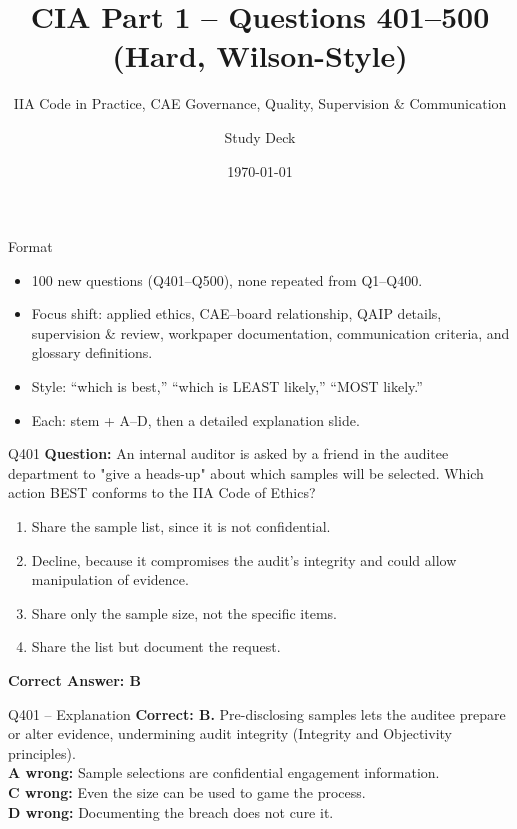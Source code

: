 \documentclass[aspectratio=169,10pt]{beamer}
\title{CIA Part 1 -- Questions 401--500 (Hard, Wilson-Style)}
\subtitle{IIA Code in Practice, CAE Governance, Quality, Supervision \& Communication}
\author{Study Deck}
\date{\today}
\begin{document}
	
	\begin{frame}
		\titlepage
	\end{frame}
	
	\begin{frame}{Format}
		\begin{itemize}
			\item 100 new questions (Q401--Q500), none repeated from Q1--Q400.
			\item Focus shift: applied ethics, CAE--board relationship, QAIP details, supervision \& review, workpaper documentation, communication criteria, and glossary definitions.
			\item Style: ``which is best,'' ``which is LEAST likely,'' ``MOST likely.''
			\item Each: stem + A--D, then a detailed explanation slide.
		\end{itemize}
	\end{frame}
	
	\begin{frame}[t]{Q401}
		\small
		\textbf{Question:} An internal auditor is asked by a friend in the auditee department to "give a heads-up" about which samples will be selected. Which action BEST conforms to the IIA Code of Ethics?
		\begin{enumerate}[label=\Alph*.,itemsep=1pt,topsep=2pt]
			\item Share the sample list, since it is not confidential.
			\item Decline, because it compromises the audit's integrity and could allow manipulation of evidence.
			\item Share only the sample size, not the specific items.
			\item Share the list but document the request.
		\end{enumerate}
		\vspace{4pt}
		\textbf{Correct Answer: B}
	\end{frame}
	
	\begin{frame}[t]{Q401 -- Explanation}
		\small
		\textbf{Correct: B.} Pre-disclosing samples lets the auditee prepare or alter evidence, undermining audit integrity (Integrity and Objectivity principles). \\[4pt]
		\textbf{A wrong:} Sample selections are confidential engagement information. \\[2pt]
		\textbf{C wrong:} Even the size can be used to game the process. \\[2pt]
		\textbf{D wrong:} Documenting the breach does not cure it.
	\end{frame}
	
\end{document}

